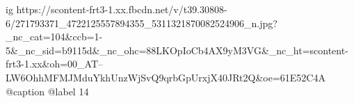  
 
 
 
 

\ifcmt
  ig https://scontent-frt3-1.xx.fbcdn.net/v/t39.30808-6/271793371_4722125557894355_5311321870082524906_n.jpg?_nc_cat=104&ccb=1-5&_nc_sid=b9115d&_nc_ohc=88LKOpIoCb4AX9yM3VG&_nc_ht=scontent-frt3-1.xx&oh=00_AT--LW6OhhMFMJMduYkhUnzWjSvQ9qrbGpUrxjX40JRt2Q&oe=61E52C4A
  @caption @label 14
\fi
